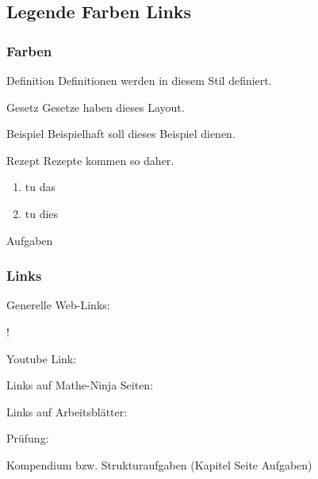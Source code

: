 %
%

\subsection{Legende Farben Links}

\subsubsection{Farben}

\begin{definition}{Definition}{}
  Definitionen werden in diesem Stil definiert.
\end{definition}

\begin{gesetz}{Gesetz}{}
  Gesetze haben dieses Layout.
\end{gesetz}

\begin{beispiel}{Beispiel}{}
  Beispielhaft soll dieses Beispiel dienen.
\end{beispiel}

\begin{rezept}{Rezept}{}
  Rezepte kommen so daher.
  \begin{enumerate}
  \item tu das
  \item tu dies
    \end{enumerate}
\end{rezept}

Aufgaben
\newpage

\subsubsection{Links}

Generelle Web-Links:

!


Youtube Link:


Links auf Mathe-Ninja Seiten:


Links auf Arbeitsblätter:


Prüfung:


Kompendium bzw. Strukturaufgaben
(Kapitel Seite Aufgaben)

\olatLinkTALSStrukturaufgabenSPF{}{}{}
\newpage

